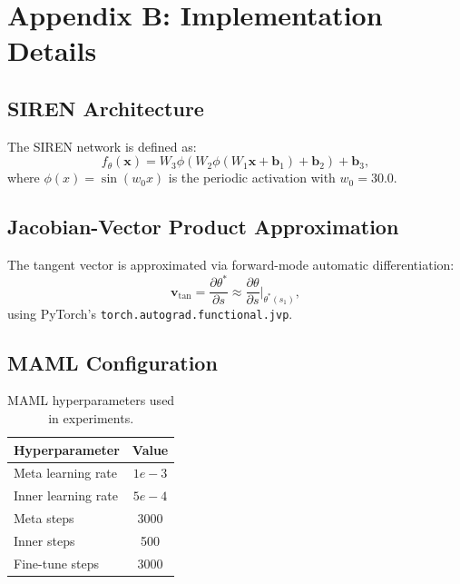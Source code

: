 \section*{Appendix B: Implementation Details}
\label{sec:appendix_implementation}

\subsection{SIREN Architecture}

The SIREN network is defined as:
\begin{equation}
    f_\theta(\mathbf{x}) = W_3 \phi(W_2 \phi(W_1 \mathbf{x} + \mathbf{b}_1) + \mathbf{b}_2) + \mathbf{b}_3,
\end{equation}
where $\phi(x) = \sin(w_0 x)$ is the periodic activation with $w_0 = 30.0$.

\subsection{Jacobian-Vector Product Approximation}

The tangent vector is approximated via forward-mode automatic differentiation:
\begin{equation}
    \mathbf{v}_{\mathrm{tan}} = \frac{\partial \theta^*}{\partial s} \approx \frac{\partial \theta}{\partial s}\Big|_{\theta^*(s_1)},
\end{equation}
using PyTorch's \texttt{torch.autograd.functional.jvp}.

\subsection{MAML Configuration}

\begin{table}[h]
    \centering
    \caption{MAML hyperparameters used in experiments.}
    \label{tab:maml_config}
    \begin{tabular}{lc}
        \toprule
        Hyperparameter & Value \\
        \midrule
        Meta learning rate & $1e-3$ \\
        Inner learning rate & $5e-4$ \\
        Meta steps & 3000 \\
        Inner steps & 500 \\
        Fine-tune steps & 3000 \\
        \bottomrule
    \end{tabular}
\end{table}

